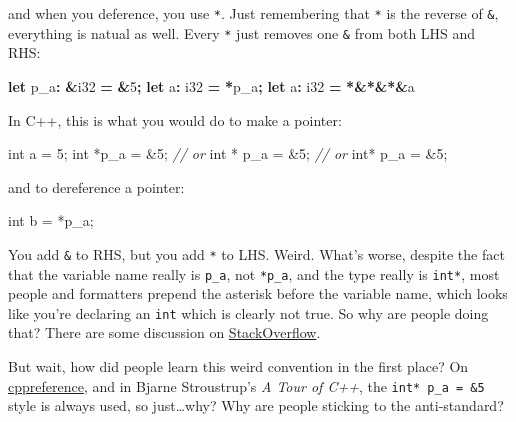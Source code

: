\documentclass[
]{book}
\newenvironment{Shaded}{\begin{snugshade}}{\end{snugshade}}
\newcommand{\CommentTok}[1]{\textcolor[rgb]{0.56,0.35,0.01}{\textit{#1}}}
\newcommand{\DataTypeTok}[1]{\textcolor[rgb]{0.13,0.29,0.53}{#1}}
\newcommand{\DecValTok}[1]{\textcolor[rgb]{0.00,0.00,0.81}{#1}}
\newcommand{\KeywordTok}[1]{\textcolor[rgb]{0.13,0.29,0.53}{\textbf{#1}}}
\newcommand{\NormalTok}[1]{#1}
\newcommand{\OperatorTok}[1]{\textcolor[rgb]{0.81,0.36,0.00}{\textbf{#1}}}
\begin{document}
and when you deference, you use \texttt{*}. Just remembering that \texttt{*} is the reverse of \texttt{\&}, everything is natual as well. Every \texttt{*} just removes one \texttt{\&} from both LHS and RHS:

\begin{Shaded}
\begin{Highlighting}[]
\KeywordTok{let}\NormalTok{ p\_a}\OperatorTok{:} \OperatorTok{\&}\DataTypeTok{i32} \OperatorTok{=} \OperatorTok{\&}\DecValTok{5}\OperatorTok{;}
\KeywordTok{let}\NormalTok{   a}\OperatorTok{:}  \DataTypeTok{i32} \OperatorTok{=} \OperatorTok{*}\NormalTok{p\_a}\OperatorTok{;}
\KeywordTok{let}\NormalTok{   a}\OperatorTok{:}  \DataTypeTok{i32} \OperatorTok{=} \OperatorTok{*\&*\&*\&}\NormalTok{a}
\end{Highlighting}
\end{Shaded}

In C++, this is what you would do to make a pointer:

\begin{Shaded}
\begin{Highlighting}[]
\DataTypeTok{int}\NormalTok{    a =  }\DecValTok{5}\NormalTok{;}
\DataTypeTok{int}\NormalTok{ *p\_a = \&}\DecValTok{5}\NormalTok{;}
\CommentTok{// or}
\DataTypeTok{int}\NormalTok{ * p\_a = \&}\DecValTok{5}\NormalTok{;}
\CommentTok{// or}
\DataTypeTok{int}\NormalTok{*  p\_a = \&}\DecValTok{5}\NormalTok{;}
\end{Highlighting}
\end{Shaded}

and to dereference a pointer:

\begin{Shaded}
\begin{Highlighting}[]
\DataTypeTok{int}\NormalTok{ b = *p\_a;}
\end{Highlighting}
\end{Shaded}

You add \texttt{\&} to RHS, but you add \texttt{*} to LHS. Weird. What's worse, despite the fact that the variable name really is \texttt{p\_a}, not \texttt{*p\_a}, and the type really is \texttt{int*}, most people and formatters prepend the asterisk before the variable name, which looks like you're declaring an \texttt{int} which is clearly not true. So why are people doing that? There are some discussion on \href{https://stackoverflow.com/questions/398395/why-is-the-asterisk-before-the-variable-name-rather-than-after-the-type}{StackOverflow}.

But wait, how did people learn this weird convention in the first place? On \href{https://en.cppreference.com/w/cpp/language/pointer}{cppreference}, and in Bjarne Stroustrup's \emph{A Tour of C++}, the \texttt{int*\ p\_a\ =\ \&5} style is always used, so just\ldots why? Why are people sticking to the anti-standard?
\end{document}
